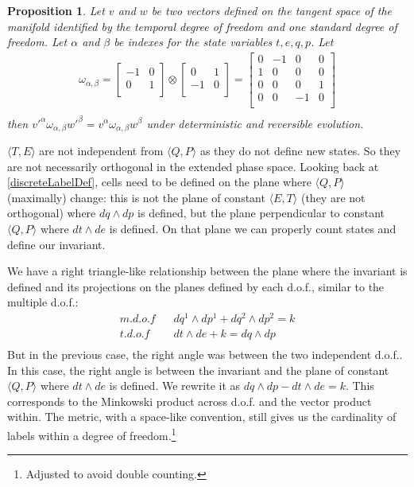 \documentclass[aps,pra,10pt,twocolumn,floatfix,nofootinbib]{revtex4-1}
\newtheorem{prop}[thm]{Proposition}
\theoremstyle{definition}
\begin{document}
\begin{prop}\label{tdofInvariant}
Let $v$ and $w$ be two vectors defined on the tangent space of the manifold identified by the temporal degree of freedom and one standard degree of freedom. Let $\alpha$ and $\beta$ be indexes for the state variables $t, e, q, p$. Let
\begin{align*}
\omega_{\alpha, \beta} =  \left[
  \begin{array}{cc}
    -1 & 0 \\
    0 & 1 \\
  \end{array}
\right] \otimes \left[
  \begin{array}{cc}
    0 & 1 \\
    -1 & 0 \\
  \end{array}
\right]
= \left[
  \begin{array}{cccc}
    0 & -1 & 0 & 0 \\
    1 & 0 & 0 & 0 \\
    0 & 0 & 0 & 1 \\
    0 & 0 & -1 & 0 \\
  \end{array}
\right] \\
\end{align*}
then $v'^{\alpha} \omega_{\alpha, \beta} w'^{\beta}=v^{\alpha} \omega_{\alpha, \beta} w^{\beta}$ under deterministic and reversible evolution.
\end{prop}

$\langle T, E \rangle$ are not independent from $\langle Q, P \rangle$ as they do not define new states. So they are not necessarily orthogonal in the extended phase space. Looking back at \ref{discreteLabelDef}, cells need to be defined on the plane where $\langle Q, P \rangle$ (maximally) change: this is not the plane of constant $\langle E, T \rangle$ (they are not orthogonal) where $dq \wedge dp$ is defined, but the plane perpendicular to constant $\langle Q, P \rangle$ where $dt \wedge de$ is defined. On that plane we can properly count states and define our invariant.

We have a right triangle-like relationship between the plane where the invariant is defined and its projections on the planes defined by each d.o.f., similar to the multiple d.o.f.:
\begin{align*}
m.d.o.f \;\;\; &dq^1 \wedge dp^1 + dq^2 \wedge dp^2 = k \\
t.d.o.f \;\;\; &dt \wedge de + k = dq \wedge dp \\
\end{align*}
But in the previous case, the right angle was between the two independent d.o.f.. In this case, the right angle is between the invariant and the plane of constant $\langle Q, P \rangle$ where $dt \wedge de$ is defined. We rewrite it as $dq \wedge dp - dt \wedge de = k$. This corresponds to the Minkowski product across d.o.f. and the vector product within. The metric, with a space-like convention, still gives us the cardinality of labels within a degree of freedom.\footnote{Adjusted to avoid double counting.}
\end{document}
